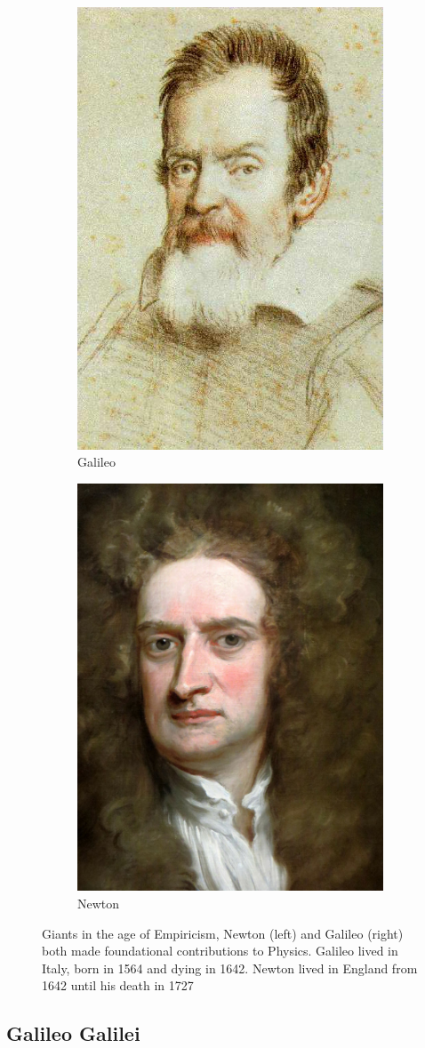 \begin{figure}[ht]
	\centering
	\begin{subfigure}{.5\textwidth}
		\centering
		\includegraphics[width=0.4\linewidth]{./figures/galileo.jpg}
		\caption{Galileo \cite{Leoni1624}}
		\label{fig:galileo}
	\end{subfigure}%
	\begin{subfigure}{0.5\textwidth}
		\centering
		\includegraphics[width=0.4\linewidth]{./figures/newton.jpg}
		\caption{Newton}
		\label{fig:newton}
	\end{subfigure}
	\caption{ 
    Giants in the age of Empiricism, Newton (left) and Galileo (right) both made
    foundational contributions to Physics.  Galileo lived in Italy, born in 1564
    and dying in 1642. Newton lived in England from 1642 until his death in 1727
	}
	\label{fig:newtongalileo}
\end{figure}

\subsection{Galileo Galilei}

